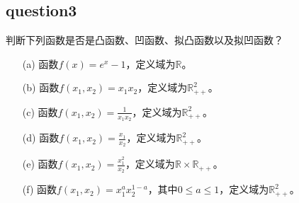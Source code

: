 \documentclass[12pt,a4paper]{ctexart}
\begin{document}
\subsection*{question3}
判断下列函数是否是凸函数、凹函数、拟凸函数以及拟凹函数？
\begin{itemize}
\item[(a)] 函数$f(x)=e^x-1$，定义域为$\mathbb{R}$。
\item[(b)] 函数$f(x_1,x_2)=x_1x_2$，定义域为$\mathbb{R}^2_{++}$。
\item[(c)] 函数$f(x_1,x_2)=\frac{1}{x_1x_2}$，定义域为$\mathbb{R}^2_{++}$。
\item[(d)] 函数$f(x_1,x_2)=\frac{x_1}{x_2}$，定义域为$\mathbb{R}^2_{++}$。
\item[(e)] 函数$f(x_1,x_2)=\frac{x_1^2}{x_2}$，定义域为$\mathbb{R} \times \mathbb{R}_{++}$。
\item[(f)] 函数$f(x_1,x_2)=x_1^a x_2^{1-a}$，其中$0 \leq a \leq 1$，定义域为$\mathbb{R}^2_{++}$。
\end{itemize} 
\end{document}
